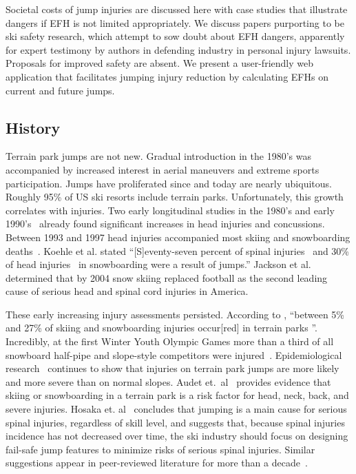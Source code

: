 \documentclass[smallextended]{svjour3}       %
\begin{document}
Societal costs of jump injuries are discussed here with case studies that
illustrate dangers if EFH is not limited appropriately. We discuss papers
purporting to be ski safety research, which attempt to sow doubt about EFH
dangers, apparently for expert testimony by authors in defending industry in
personal injury lawsuits. Proposals for improved safety are absent. We  present
a user-friendly web application that facilitates jumping injury reduction by
calculating EFHs on current and future jumps.

\subsection{History}
\label{sec:hist}
%
Terrain park jumps are not new. Gradual introduction in the 1980's was
accompanied by increased interest in aerial maneuvers and extreme sports
participation.  Jumps have proliferated since and today are nearly ubiquitous.
Roughly 95\% of US ski resorts include terrain parks. Unfortunately, this
growth correlates with injuries. Two early longitudinal studies in the 1980's
and early 1990's~\cite{Deibert1998,Furrer1995} already found significant
increases in head injuries and concussions. Between 1993 and 1997 head injuries
accompanied most skiing and snowboarding deaths~\cite{CPSC1999}. Koehle et al.
\cite{Koehle2002} stated ``[S]eventy-seven percent of spinal
injuries~\cite{Tarazi1999} and 30\% of head injuries~\cite{Fukuda2001} in
snowboarding were a result of jumps.'' Jackson et al.~\cite{Jackson2004}
determined that by 2004 snow skiing replaced football as the second leading
cause of serious head and spinal cord injuries in America.

These early increasing injury assessments persisted. According to
\cite{Russell2014}, ``between 5\% and 27\% of skiing and snowboarding injuries
occur[red] in terrain parks
\cite{Bridges2003,Goulet2007,Moffat2009,Greve2009,Brooks2010,Ruedl2013}''.
Incredibly, at the first Winter Youth Olympic Games more than a third of all
snowboard half-pipe and slope-style competitors were injured~\cite{Ruedl2012}.
Epidemiological research~\cite{Carus2016,Audet2019a,Hosaka2020}  continues to
show that injuries on terrain park jumps are more likely and more severe than
on normal slopes.  Audet et.~al~\cite{Audet2019a} provides evidence that skiing
or snowboarding in a terrain park is a risk factor for head, neck, back, and
severe injuries. Hosaka et. al~\cite{Hosaka2020} concludes that jumping is a
main cause for serious spinal injuries, regardless of skill level, and suggests
that, because spinal injuries incidence  has not decreased over time,  the ski
industry should focus on designing fail-safe jump features to minimize risks of
serious spinal injuries. Similar suggestions appear in peer-reviewed literature
for more than a
decade~\cite{Hubbard2009,Swedberg2012,McNeil2012,McNeil2012a,Hubbard2015,Levy2015,Petrone2017,Moore2018}.
\end{document}
